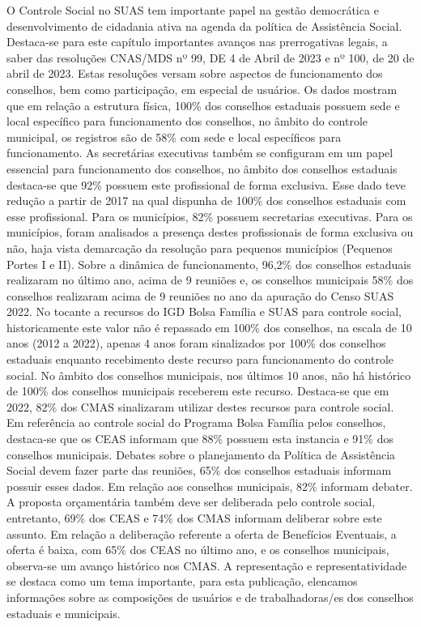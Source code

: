 \documentclass[
  letterpaper,
  DIV=11,
  numbers=noendperiod]{scrreprt}
\begin{document}
O Controle Social no SUAS tem importante papel na gestão democrática e
desenvolvimento de cidadania ativa na agenda da política de Assistência
Social. Destaca-se para este capítulo importantes avanços nas
prerrogativas legais, a saber das resoluções CNAS/MDS nº 99, DE 4 de
Abril de 2023 e nº 100, de 20 de abril de 2023. Estas resoluções versam
sobre aspectos de funcionamento dos conselhos, bem como participação, em
especial de usuários. Os dados mostram que em relação a estrutura
física, 100\% dos conselhos estaduais possuem sede e local específico
para funcionamento dos conselhos, no âmbito do controle municipal, os
registros são de 58\% com sede e local específicos para funcionamento.
As secretárias executivas também se configuram em um papel essencial
para funcionamento dos conselhos, no âmbito dos conselhos estaduais
destaca-se que 92\% possuem este profissional de forma exclusiva. Esse
dado teve redução a partir de 2017 na qual dispunha de 100\% dos
conselhos estaduais com esse profissional. Para os municípios, 82\%
possuem secretarias executivas. Para os municípios, foram analisados a
presença destes profissionais de forma exclusiva ou não, haja vista
demarcação da resolução para pequenos municípios (Pequenos Portes I e
II). Sobre a dinâmica de funcionamento, 96,2\% dos conselhos estaduais
realizaram no último ano, acima de 9 reuniões e, os conselhos municipais
58\% dos conselhos realizaram acima de 9 reuniões no ano da apuração do
Censo SUAS 2022. No tocante a recursos do IGD Bolsa Família e SUAS para
controle social, historicamente este valor não é repassado em 100\% dos
conselhos, na escala de 10 anos (2012 a 2022), apenas 4 anos foram
sinalizados por 100\% dos conselhos estaduais enquanto recebimento deste
recurso para funcionamento do controle social. No âmbito dos conselhos
municipais, nos últimos 10 anos, não há histórico de 100\% dos conselhos
municipais receberem este recurso. Destaca-se que em 2022, 82\% dos CMAS
sinalizaram utilizar destes recursos para controle social. Em referência
ao controle social do Programa Bolsa Família pelos conselhos, destaca-se
que os CEAS informam que 88\% possuem esta instancia e 91\% dos
conselhos municipais. Debates sobre o planejamento da Política de
Assistência Social devem fazer parte das reuniões, 65\% dos conselhos
estaduais informam possuir esses dados. Em relação aos conselhos
municipais, 82\% informam debater. A proposta orçamentária também deve
ser deliberada pelo controle social, entretanto, 69\% dos CEAS e 74\%
dos CMAS informam deliberar sobre este assunto. Em relação a deliberação
referente a oferta de Benefícios Eventuais, a oferta é baixa, com 65\%
dos CEAS no último ano, e os conselhos municipais, observa-se um avanço
histórico nos CMAS. A representação e representatividade se destaca como
um tema importante, para esta publicação, elencamos informações sobre as
composições de usuários e de trabalhadoras/es dos conselhos estaduais e
municipais.
\end{document}
